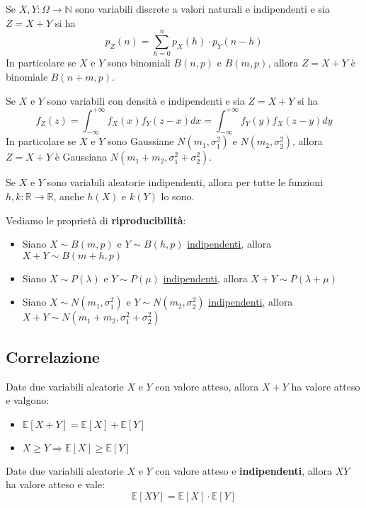 \begin{proposition}
	Se $X,Y:\Omega \to \mathbb{N}$ sono variabili discrete a valori naturali e indipendenti e sia $Z=X+Y$ si ha
	\begin{equation}
		p_Z(n) = \sum_{h=0}^{n}p_X(h) \cdot p_Y(n-h)
	\end{equation}
	In particolare se $X$ e $Y$ sono binomiali $B(n,p)$ e $B(m,p)$, allora $Z=X+Y$ è binomiale $B(n+m,p)$.
\end{proposition}
\begin{proposition}
	Se $X$ e $Y$ sono variabili con densità e indipendenti e sia $Z=X+Y$ si ha
	\begin{equation}
		f_Z(z)=\int_{-\infty}^{+\infty}f_X(x)f_Y(z-x)dx = \int_{-\infty}^{+\infty}f_Y(y)f_X(z-y)dy
	\end{equation}
	In particolare se $X$ e $Y$ sono Gaussiane $N(m_1,\sigma_1^2)$ e $N(m_2,\sigma_2^2)$, allora $Z=X+Y$ è Gaussiana $N(m_1+m_2, \sigma_1^2+\sigma_2^2)$.
\end{proposition}

\begin{proposition}
	Se $X$ e $Y$ sono variabili aleatorie indipendenti, allora per tutte le funzioni $h,k: \mathbb{R} \to \mathbb{R}$, anche $h(X)$ e $k(Y)$ lo sono.
\end{proposition}

\begin{proposition}
	Vediamo le proprietà di \textbf{riproducibilità}:
	\begin{itemize}
		\item Siano $X \sim B(m,p)$ e $Y \sim B(h,p)$ \underline{indipendenti}, allora $X+Y \sim B(m+h,p)$
		\item Siano $X \sim P(\lambda)$ e $Y \sim P(\mu)$ \underline{indipendenti}, allora $X+Y \sim P(\lambda+\mu)$
		\item Siano $X \sim N(m_1, \sigma_1^2)$ e $Y \sim N(m_2, \sigma_2^2)$ \underline{indipendenti}, allora $X+Y \sim N(m_1+m_2, \sigma_1^2+\sigma_2^2)$
	\end{itemize}
\end{proposition}

\subsection{Correlazione}
\begin{proposition}
	Date due variabili aleatorie $X$ e $Y$ con valore atteso, allora $X+Y$ ha valore atteso e valgono:
	\begin{itemize}
		\item $\mathbb{E}[X+Y] = \mathbb{E}[X] + \mathbb{E}[Y]$
		\item $X \geq Y \Longrightarrow \mathbb{E}[X] \geq \mathbb{E}[Y]$
	\end{itemize}
\end{proposition}
\begin{definition}
	Date due variabili aleatorie $X$ e $Y$ con valore atteso e \textbf{indipendenti}, allora $XY$ ha valore atteso e vale:
	\begin{equation}
		\mathbb{E}[XY] = \mathbb{E}[X] \cdot \mathbb{E}[Y]
	\end{equation}
\end{definition}

